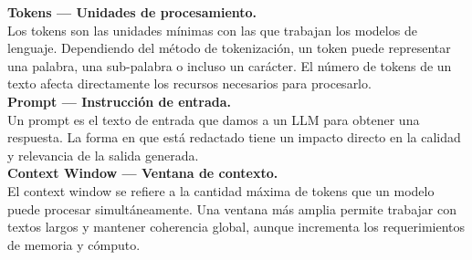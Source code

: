 
\noindent\textbf {Tokens — Unidades de procesamiento.\cite{Grefenstette1999}} \\
Los tokens son las unidades mínimas con las que trabajan los modelos de lenguaje. Dependiendo del método de tokenización, un token puede representar una palabra, una sub-palabra o incluso un carácter. El número de tokens de un texto afecta directamente los recursos necesarios para procesarlo. \\

\noindent\textbf {Prompt — Instrucción de entrada.\cite{Schulhoff2025}} \\
Un prompt es el texto de entrada que damos a un LLM para obtener una respuesta. La forma en que está redactado tiene un impacto directo en la calidad y relevancia de la salida generada. \\

\noindent\textbf {Context Window — Ventana de contexto.\cite{context_window}} \\
El context window se refiere a la cantidad máxima de tokens que un modelo puede procesar simultáneamente. Una ventana más amplia permite trabajar con textos largos y mantener coherencia global, aunque incrementa los requerimientos de memoria y cómputo. \\

